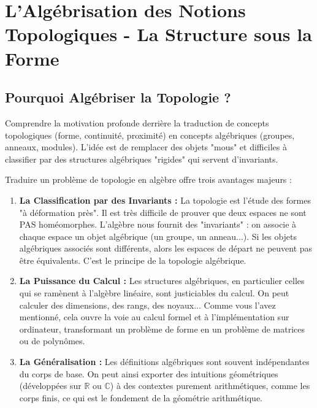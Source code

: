 \chapter{L'Algébrisation des Notions Topologiques - La Structure sous la Forme}

\section{Pourquoi Algébriser la Topologie ?}

\begin{objectif}
    Comprendre la motivation profonde derrière la traduction de concepts topologiques (forme, continuité, proximité) en concepts algébriques (groupes, anneaux, modules). L'idée est de remplacer des objets "mous" et difficiles à classifier par des structures algébriques "rigides" qui servent d'invariants.
\end{objectif}

\begin{remark}
    Traduire un problème de topologie en algèbre offre trois avantages majeurs :
    \begin{enumerate}
        \item \textbf{La Classification par des Invariants :} La topologie est l'étude des formes "à déformation près". Il est très difficile de prouver que deux espaces ne sont PAS homéomorphes. L'algèbre nous fournit des "invariants" : on associe à chaque espace un objet algébrique (un groupe, un anneau...). Si les objets algébriques associés sont différents, alors les espaces de départ ne peuvent pas être équivalents. C'est le principe de la topologie algébrique.
        \item \textbf{La Puissance du Calcul :} Les structures algébriques, en particulier celles qui se ramènent à l'algèbre linéaire, sont justiciables du calcul. On peut calculer des dimensions, des rangs, des noyaux... Comme vous l'avez mentionné, cela ouvre la voie au calcul formel et à l'implémentation sur ordinateur, transformant un problème de forme en un problème de matrices ou de polynômes.
        \item \textbf{La Généralisation :} Les définitions algébriques sont souvent indépendantes du corps de base. On peut ainsi exporter des intuitions géométriques (développées sur $\mathbb{R}$ ou $\mathbb{C}$) à des contextes purement arithmétiques, comme les corps finis, ce qui est le fondement de la géométrie arithmétique.
    \end{enumerate}
\end{remark}

